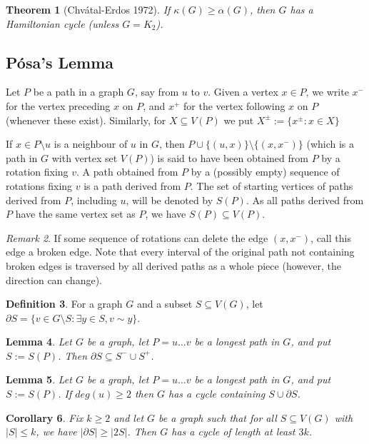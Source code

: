\documentclass[10pt, fleqn, a4paper, landscape]{article}
\theoremstyle{plain} %
\newtheorem{thm}{Theorem}
\newtheorem{lem}[thm]{Lemma}
\newtheorem{cor}[thm]{Corollary}
\theoremstyle{remark} %
\newtheorem{rem}[thm]{Remark}
\theoremstyle{definition} %
\newtheorem{defi}[thm]{Definition}
\begin{document}
\begin{multicols}{3}
\begin{tiny}
\begin{thm}[Chvátal-Erdos 1972]
If $\kappa (G)\ge\alpha(G)$, then $G$ has a Hamiltonian cycle (unless
$G = K_2$).
\end{thm}

\subsection{Pósa’s Lemma}
Let $P$ be a path in a graph $G$, say from $u$ to $v$. Given a vertex $x \in P$, we write $x^-$ for the vertex preceding $x$ on $P$, and $x^+$ for the vertex following $x$ on $P$ (whenever these exist). Similarly, for $X \subseteq V (P)$ we put $X^\pm:=\{x^\pm:x\in X\}$

If $x \in P\setminus u$ is a neighbour of $u$ in $G$, then $P \cup \{(u, x)\}\setminus\{(x, x^-)\}$ (which is a path in $G$ with vertex
set $V (P)$) is said to have been obtained from $P$ by a rotation fixing $v$. A path obtained from $P$ by a (possibly empty) sequence of rotations fixing $v$ is a path derived from $P$. The set of starting vertices of paths derived from $P$, including $u$, will be denoted by $S(P)$. As all paths derived from $P$ have the same vertex set as $P$, we have $S(P) \subseteq V (P)$.

\begin{rem}
If some sequence of rotations can delete the edge $(x, x^-)$, call this edge a broken edge. Note that every interval of the original path not containing broken edges is traversed by all derived paths as a whole piece (however, the direction can change).
\end{rem}

\begin{defi}
For a graph $G$ and a subset $S \subseteq V (G)$, let $\partial S = \{v \in G\setminus S : \exists y \in  S, v\sim y\}$.
\end{defi}

\begin{lem}
Let $G$ be a graph, let $P = u \dots v$ be a longest path in $G$, and put $S := S(P)$. Then $\partial S \subseteq S^- \cup  S^+$.
\end{lem}

\begin{lem}
Let $G$ be a graph, let $P = u \dots v$ be a longest path in $G$, and put $S := S(P)$. If $deg(u) \ge 2$ then $ G$ has a cycle containing $S \cup \partial S$.
\end{lem}

\begin{cor}
Fix $k \ge 2$ and let $G$ be a graph such that for all $S \subseteq V (G)$ with $|S|\le k$, we have $|\partial S|\ge |2S|$. Then $G$ has a cycle of length at least $3k$.
\end{cor}


\end{tiny}
\end{multicols}
\end{document}
